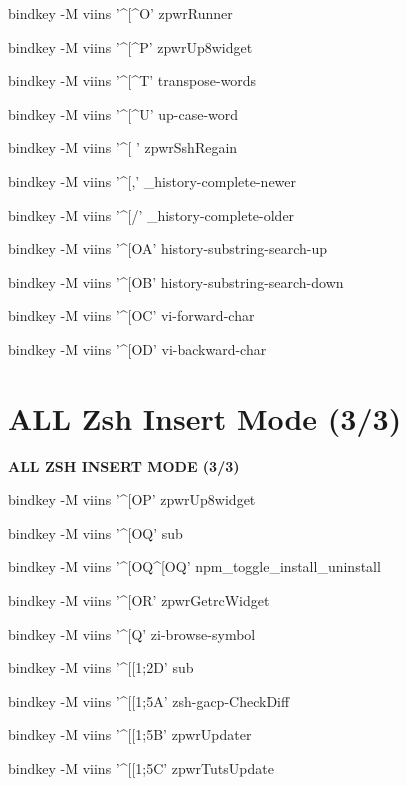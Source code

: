 \documentclass[11pt,a4paper,twoside]{book}
\begin{document}
bindkey -M viins '\textasciicircum{}[\textasciicircum{}O' zpwrRunner

bindkey -M viins '\textasciicircum{}[\textasciicircum{}P' zpwrUp8widget

bindkey -M viins '\textasciicircum{}[\textasciicircum{}T' transpose-words

bindkey -M viins '\textasciicircum{}[\textasciicircum{}U' up-case-word

bindkey -M viins '\textasciicircum{}[ ' zpwrSshRegain

bindkey -M viins '\textasciicircum{}[,' \_history-complete-newer

bindkey -M viins '\textasciicircum{}[/' \_history-complete-older

bindkey -M viins '\textasciicircum{}[OA' history-substring-search-up

bindkey -M viins '\textasciicircum{}[OB' history-substring-search-down

bindkey -M viins '\textasciicircum{}[OC' vi-forward-char

bindkey -M viins '\textasciicircum{}[OD' vi-backward-char


\vspace{16pt}

\section{ALL Zsh Insert Mode (3/3)}


\vspace{10pt}
{\large\bfseries\color{neoncyan} ALL ZSH INSERT MODE (3/3)}\vspace{6pt}

bindkey -M viins '\textasciicircum{}[OP' zpwrUp8widget

bindkey -M viins '\textasciicircum{}[OQ' sub

bindkey -M viins '\textasciicircum{}[OQ\textasciicircum{}[OQ' npm\_toggle\_install\_uninstall

bindkey -M viins '\textasciicircum{}[OR' zpwrGetrcWidget

bindkey -M viins '\textasciicircum{}[Q' zi-browse-symbol

bindkey -M viins '\textasciicircum{}[[1;2D' sub

bindkey -M viins '\textasciicircum{}[[1;5A' zsh-gacp-CheckDiff

bindkey -M viins '\textasciicircum{}[[1;5B' zpwrUpdater

bindkey -M viins '\textasciicircum{}[[1;5C' zpwrTutsUpdate
\end{document}
